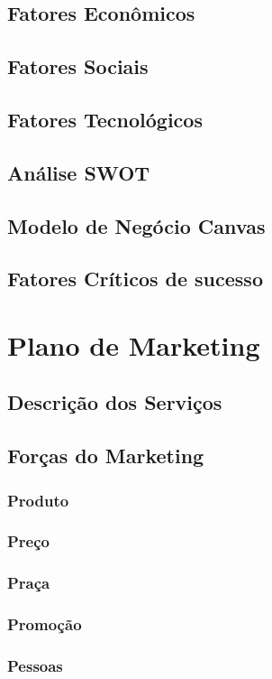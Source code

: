 \documentclass[a4paper, 12pt]{paper}
\begin{document}
\subsection{Fatores Econômicos}
\subsection{Fatores Sociais}
\subsection{Fatores Tecnológicos}
\subsection{Análise SWOT}
\subsection{Modelo de Negócio Canvas}
\subsection{Fatores Críticos de sucesso}
\newpage
\section{Plano de Marketing}
\subsection{Descrição dos Serviços}
\subsection{Forças do Marketing}
\subsubsection{Produto}
\subsubsection{Preço}
\subsubsection{Praça}
\subsubsection{Promoção}
\subsubsection{Pessoas}
\end{document}
